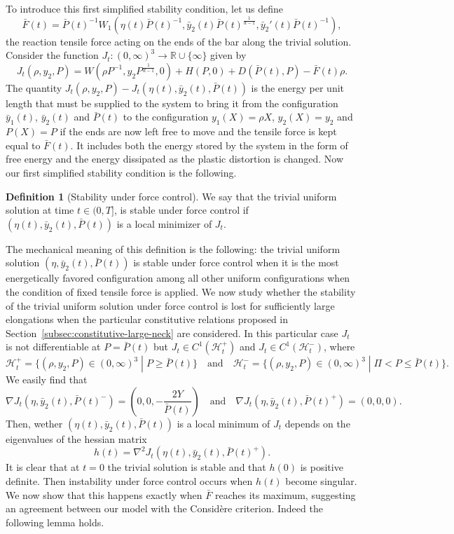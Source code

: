 \documentclass[a4paper,10pt,oneside]{amsbook}
\numberwithin{section}{chapter}
\numberwithin{equation}{chapter}
\theoremstyle{definition}
\newtheorem{defi}[prop]{Definition}
\begin{document}
To introduce this first simplified stability condition, let us define
\[
\bar F(t)=\bar{P}(t)^{-1}W_1(\eta(t)\bar{P}(t)^{-1},\bar{y}_2(t)\bar P(t)^\frac{1}{d-1},\bar{y}_2'(t)\bar{P}(t)^{-1}),
\]
the reaction tensile force acting on the ends of the bar along the trivial solution. Consider the function $J_t\colon(0,\infty)^3\to\mathbb{R}\cup\{\infty\}$ given by
\[
J_t(\rho,y_2,P)=W(\rho P^{-1},y_2P^\frac{1}{d-1},0)+H(P,0)+D(\bar{P}(t),P)-\bar{F}(t)\rho.
\]
The quantity $J_t(\rho,y_2,P)-J_t(\eta(t),\bar{y}_2(t),\bar{P}(t))$ is the energy per unit length that must be supplied to the system to bring it from the configuration $\bar y_1(t)$, $\bar y_2(t)$ and $\bar P(t)$ to the configuration $y_1(X)=\rho X$, $y_2(X)=y_2$ and $P(X)=P$ if the ends are now left free to move and the tensile force is kept equal to $\bar F(t)$. It includes both the energy stored by the system in the form of free energy and the energy dissipated as the plastic distortion is changed. Now our first simplified stability condition is the following.
\begin{defi}[Stability under force control]
We say that the trivial uniform solution at time $t\in(0,T]$, is stable under force control if $(\eta(t),\bar{y}_2(t),\bar{P}(t))$ is a local minimizer of $J_t$.
\end{defi}
The mechanical meaning of this definition is the following: the trivial uniform solution $(\eta,\bar{y}_2(t),\bar{P}(t))$ is stable under force control when it is the most energetically favored configuration among all other uniform configurations when the condition of fixed tensile force is applied. We now study whether the stability of the trivial uniform solution under force control is lost for sufficiently large elongations when the particular constitutive relations proposed in Section~\ref{subsec:constitutive-large-neck} are considered. In this particular case $J_t$ is not differentiable at $P=\bar{P}(t)$ but $J_t\in C^1(\mathscr H^+_t)$ and $J_t\in C^1(\mathscr H^-_t)$, where
\[
\mathscr H^+_t=\{(\rho,y_2,P)\in(0,\infty)^3\;|\;P\ge\bar{P}(t)\}\quad\text{and}\quad \mathscr H^-_t=\{(\rho,y_2,P)\in(0,\infty)^3\;|\;\Pi<P\le\bar{P}(t)\}.
\]
We easily find that
\[
\nabla J_t(\eta,\bar y_2(t),\bar P(t)^-)=\left(0,0,-\frac{2Y}{\bar P(t)}\right)\quad\text{and}\quad\nabla J_t(\eta,\bar y_2(t),\bar P(t)^+)=(0,0,0).
\]
Then, wether $(\eta(t),\bar y_2(t),\bar P(t))$ is a local minimum of $J_t$ depends on the eigenvalues of the hessian matrix
\[
h(t)=\nabla^2 J_t(\eta(t),\bar y_2(t),\bar P(t)^+).
\]
It is clear that at $t=0$ the trivial solution is stable and that $h(0)$ is positive definite. Then instability under force control occurs when $h(t)$ become singular. We now show that this happens exactly when $\bar{F}$ reaches its maximum, suggesting an agreement between our model with the Considère criterion. Indeed the following lemma holds.
\end{document}
